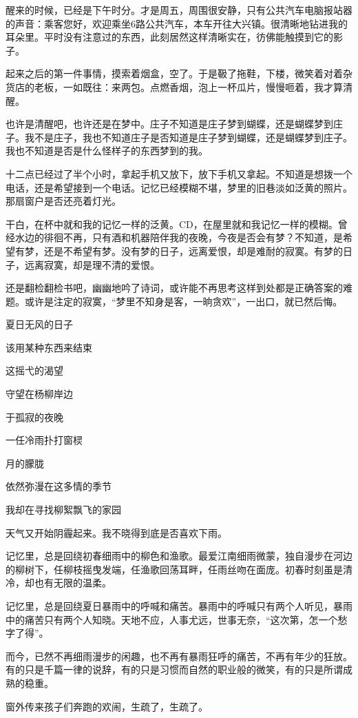 醒来的时候，已经是下午时分。才是周五，周围很安静，只有公共汽车电脑报站器的声音：乘客您好，欢迎乘坐6路公共汽车，本车开往大兴镇。很清晰地钻进我的耳朵里。平时没有注意过的东西，此刻居然这样清晰实在，彷佛能触摸到它的影子。

\pskip
起来之后的第一件事情，摸索着烟盒，空了。于是靸了拖鞋，下楼，微笑着对着杂货店的老板，一如既往：来两包。点燃香烟，泡上一杯瓜片，慢慢咂着，我才算清醒。

\pskip
也许是清醒吧，也许还是在梦中。庄子不知道是庄子梦到蝴蝶，还是蝴蝶梦到庄子。我不是庄子，我也不知道庄子是否知道是庄子梦到蝴蝶，还是蝴蝶梦到庄子。我也不知道是否是什么怪样子的东西梦到的我。


十二点已经过了半个小时，拿起手机又放下，放下手机又拿起。不知道是想拨一个电话，还是希望接到一个电话。记忆已经模糊不堪，梦里的旧巷淡如泛黄的照片。那扇窗户是否还亮着灯光。

\pskip
干白，在杯中就和我的记忆一样的泛黄。CD，在屋里就和我记忆一样的模糊。曾经水边的徘徊不再，只有酒和机器陪伴我的夜晚，今夜是否会有梦？不知道，是希望有梦，还是不希望有梦。没有梦的日子，远离爱恨，却是难耐的寂寞。有梦的日子，远离寂寞，却是理不清的爱恨。

\pskip
还是翻检翻检书吧，幽幽地吟了诗词，或许能不再思考这样到处都是正确答案的难题。或许是注定的寂寞，“梦里不知身是客，一晌贪欢”，一出口，就已然后悔。

\pskip
夏日无风的日子

该用某种东西来结束

这摇弋的渴望

\pskip
守望在杨柳岸边

于孤寂的夜晚

一任冷雨扑打窗棂

\pskip
月的朦胧

依然弥漫在这多情的季节

我却在寻找柳絮飘飞的家园


天气又开始阴霾起来。我不晓得到底是否喜欢下雨。

\pskip
记忆里，总是回绕初春细雨中的柳色和渔歌。最爱江南细雨微蒙，独自漫步在河边的柳树下，任柳枝摇曳发端，任渔歌回荡耳畔，任雨丝吻在面庞。初春时刻虽是清冷，却也有无限的温柔。

\pskip
记忆里，总是回绕夏日暴雨中的呼喊和痛苦。暴雨中的呼喊只有两个人听见，暴雨中的痛苦只有两个人知晓。天地不应，人事尤远，世事无奈，“这次第，怎一个愁字了得”。

\pskip
而今，已然不再细雨漫步的闲趣，也不再有暴雨狂呼的痛苦，不再有年少的狂放。有的只是千篇一律的说辞，有的只是习惯而自然的职业般的微笑，有的只是所谓成熟的稳重。

\pskip
窗外传来孩子们奔跑的欢闹，生疏了，生疏了。
